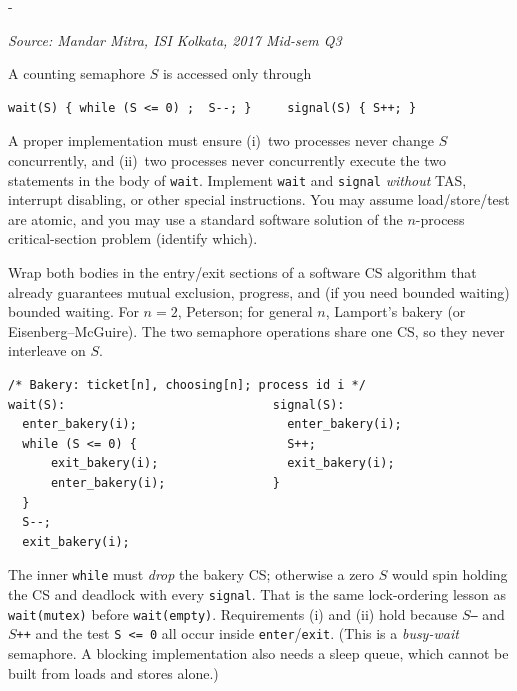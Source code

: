 \documentclass[11pt,a4paper]{article}
\makeatletter
\newcommand{\keepspace}[1]{\par\penalty-100\begingroup
  \setlength{\dimen@}{#1}\dimen@ii\pagegoal\advance\dimen@ii-\pagetotal
  \ifdim\dimen@>\dimen@ii\ifdim\dimen@ii>\z@\vfil\fi\break\fi\endgroup}
\newcounter{qn}[section]
\newenvironment{Qn}[4]{%
  \refstepcounter{qn}\keepspace{7\baselineskip}%
  \begin{tcolorbox}[qboxstyle, title={Q\thesection.\theqn\ \ [#1 \textbar\ #2]\ \ #4}]%
  {\footnotesize\color{g3}\textit{Source: #3}}\par\smallskip%
}{%
  \end{tcolorbox}%
}
\newenvironment{Sol}{%
  \begin{tcolorbox}[sboxstyle, title={Solution}]%
}{%
  \end{tcolorbox}\vspace{0.35em}%
}
\makeatother
\begin{document}
\begin{Qn}{Medium-Hard}{Lect 19}{Mandar Mitra, ISI Kolkata, 2017 Mid-sem Q3}{Atomic wait/signal with no TAS and no interrupt disable}
A counting semaphore $S$ is accessed only through
\begin{lstlisting}[numbers=none]
wait(S) { while (S <= 0) ;  S--; }     signal(S) { S++; }
\end{lstlisting}
A proper implementation must ensure (i)~two processes never change $S$
concurrently, and (ii)~two processes never concurrently execute the two
statements in the body of \texttt{wait}. Implement \texttt{wait} and
\texttt{signal} \emph{without} TAS, interrupt disabling, or other special
instructions. You may assume load/store/test are atomic, and you may use
a standard software solution of the $n$-process critical-section problem
(identify which).
\end{Qn}
\begin{Sol}
Wrap both bodies in the entry/exit sections of a software CS algorithm
that already guarantees mutual exclusion, progress, and (if you need
bounded waiting) bounded waiting. For $n=2$, Peterson; for general $n$,
Lamport's bakery (or Eisenberg--McGuire). The two semaphore operations
share one CS, so they never interleave on $S$.

\begin{lstlisting}[numbers=none]
/* Bakery: ticket[n], choosing[n]; process id i */
wait(S):                             signal(S):
  enter_bakery(i);                     enter_bakery(i);
  while (S <= 0) {                     S++;
      exit_bakery(i);                  exit_bakery(i);
      enter_bakery(i);               }
  }
  S--;
  exit_bakery(i);
\end{lstlisting}
The inner \texttt{while} must \emph{drop} the bakery CS; otherwise a
zero $S$ would spin holding the CS and deadlock with every
\texttt{signal}. That is the same lock-ordering lesson as
\texttt{wait(mutex)} before \texttt{wait(empty)}. Requirements (i) and
(ii) hold because $S$\texttt{--} and $S$\texttt{++} and the test
\texttt{S <= 0} all occur inside \texttt{enter}/\texttt{exit}. (This is
a \emph{busy-wait} semaphore. A blocking implementation also needs a
sleep queue, which cannot be built from loads and stores alone.)
\end{Sol}
\end{document}
